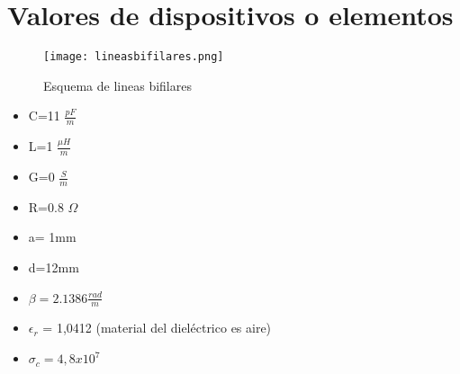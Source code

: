 \section{Valores de dispositivos o elementos}
\begin{figure}[H]
    \centering
    \texttt{[image: lineasbifilares.png]}
    \caption{Esquema de lineas bifilares}
    \label{fig:EsquemaBifilar}
\end{figure}

\begin{itemize}
    \item C=11 $\frac{pF}{m}$
    \item L=1 $\frac{\mu H}{m}$
    \item G=0 $\frac{S}{m}$
    \item R=0.8 $\Omega$
    \item a= 1mm
    \item d=12mm
    \item $\beta = 2.1386 \frac{rad}{m}$
    \item $\epsilon_r$ = 1,0412 (material del dieléctrico es aire)
    \item  $\sigma_c= 4,8x10^7$
\end{itemize}


\pagebreak